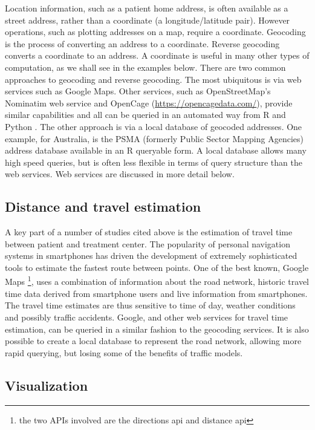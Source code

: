 \documentclass[utf8]{frontiersHLTH}
\begin{document}
Location information, such as a patient home address, is often
available as a street address, rather than a coordinate (a
longitude/latitude pair). However operations, such as plotting
addresses on a map, require a coordinate. Geocoding is the process of
converting an address to a coordinate. Reverse geocoding converts a
coordinate to an address. A coordinate is useful in many other types
of computation, as we shall see in the examples below. There are two
common approaches to geocoding and reverse geocoding. The most
ubiquitous is via web services such as Google Maps. Other services,
such as OpenStreetMap's Nominatim web service and OpenCage
(\url{https://opencagedata.com/}), provide similar capabilities and
all can be queried in an automated way from R and Python
\cite{opencage}. The other approach is via a local database of
geocoded addresses. One example, for Australia, is the PSMA (formerly
Public Sector Mapping Agencies) address database available in an R
queryable form. A local database allows many high speed queries, but
is often less flexible in terms of query structure than the web
services. Web services are discussed in more detail below.

\subsection{Distance and travel estimation}\label{distance-and-travel-estimation} 

A key part of a number of studies cited above is the estimation of
travel time between patient and treatment center. The popularity of
personal navigation systems in smartphones has driven the development
of extremely sophisticated tools to estimate the fastest route between
points. One of the best known, Google Maps \footnote{the two APIs
  involved are the directions api and distance api}, uses a
combination of information about the road network, historic travel
time data derived from smartphone users and live information from
smartphones. The travel time estimates are thus sensitive to time of
day, weather conditions and possibly traffic accidents. Google, and
other web services for travel time estimation, can be queried in a
similar fashion to the geocoding services. It is also possible to
create a local database to represent the road network, allowing more
rapid querying, but losing some of the benefits of traffic models.

\subsection{Visualization}\label{visualization} 
\end{document}

